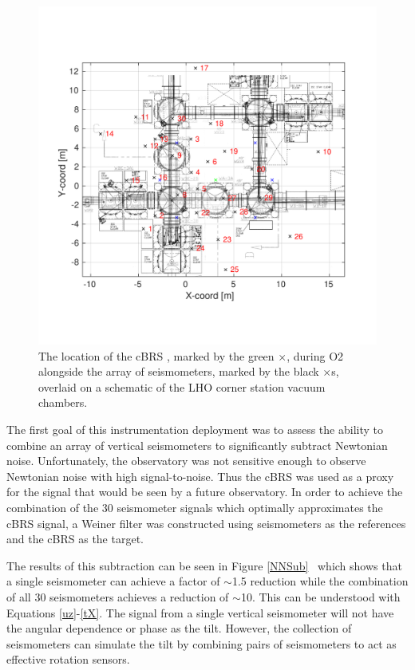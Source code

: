 \documentclass [12pt, proquest]{uwthesis}[2019]
\begin{document}
\begin{figure}[!h]
\begin{center}
\includegraphics[width=\textwidth]{NNArray.pdf}
\end{center}
\caption[The location of the cBRS during O2 alongside the array of seismometers]{The location of the cBRS , marked by the green $\times$, during O2 alongside the array of seismometers, marked by the black $\times$s, overlaid on a schematic of the LHO corner station vacuum chambers.}
\label{NNArray}
\end{figure}

The first goal of this instrumentation deployment was to assess the ability to combine an array of vertical seismometers to significantly subtract Newtonian noise. Unfortunately, the observatory was not sensitive enough to observe Newtonian noise with high signal-to-noise. Thus the cBRS was used as a proxy for the signal that would be seen by a future observatory. In order to achieve the combination of the 30 seismometer signals which optimally approximates the cBRS signal, a Weiner filter was constructed using seismometers as the references and the cBRS as the target. 

The results of this subtraction can be seen in Figure \ref{NNSub}~\cite{NN} which shows that a single seismometer can achieve a factor of $\sim$1.5 reduction while the combination of all 30 seismometers achieves a reduction of $\sim$10. This can be understood with Equations \ref{uz}-\ref{tX}. The signal from a single vertical seismometer will not have the angular dependence or phase as the tilt. However, the collection of seismometers can simulate the tilt by combining pairs of seismometers to act as effective rotation sensors.
\end{document}
